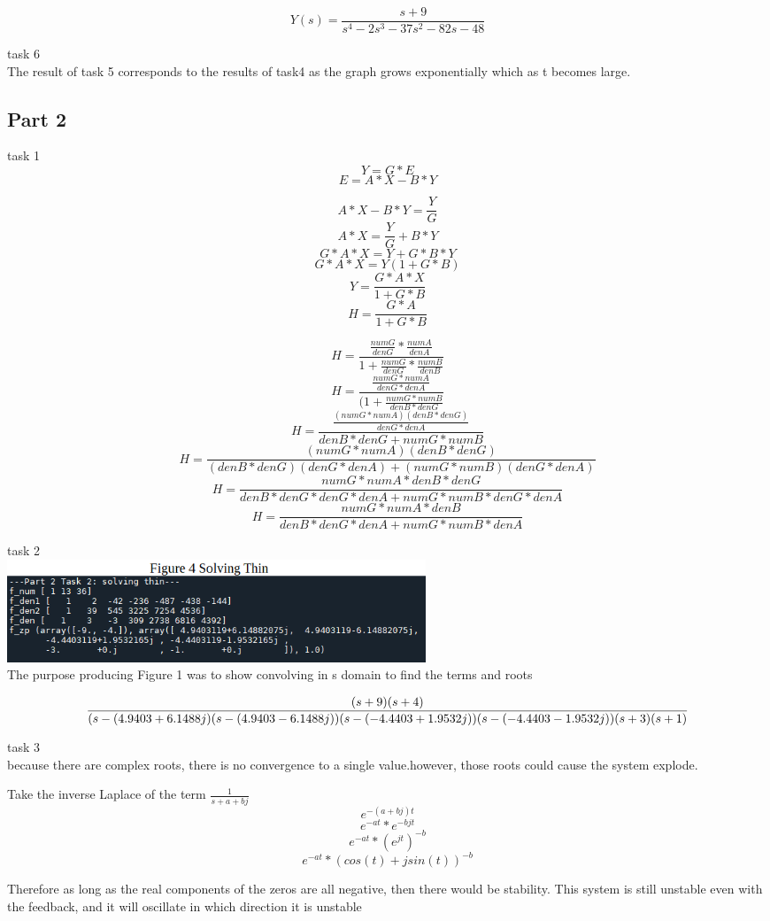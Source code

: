 \documentclass[12pt,a4paper]{article}
\begin{document}
\[Y(s) = \frac {s+9} {s^4-2s^3-37s^2-82s-48}\]

task 6\\
The result of task 5 corresponds to the results of task4 as the graph grows exponentially which as t becomes large.



\subsection*{Part 2}
task 1\\
\[Y = G*E\]
\[E=A*X-B*Y\]

\[A*X-B*Y = \frac Y G\]
\[A*X = \frac Y G +B*Y\]
\[G*A*X = Y+G*B*Y\]
\[G*A*X = Y(1+G*B)\]
\[Y = \frac {G*A*X} {1+G*B }\]
\[H = \frac{G*A}{1+G*B}\]


\[H = \frac {\frac{numG}{denG}* \frac{numA}{denA}}{1+\frac {numG}{denG}*\frac{numB}{denB}}\]
\[H = \frac {\frac{numG*numA}{denG*denA}}{(1+\frac{numG*numB}{denB*denG}}\]
\[H = \frac {\frac{(numG*numA)(denB*denG)}{denG*denA}}{denB*denG+numG*numB}\]
\[H = \frac {(numG*numA)(denB*denG)}{(denB*denG)(denG*denA)+(numG*numB)(denG*denA)}\]
\[H = \frac {numG*numA*denB*denG}{denB*denG*denG*denA+numG*numB*denG*denA}\]
\[H = \frac {numG*numA*denB}{denB*denG*denA + numG*numB*denA}\]


task 2\\
\includegraphics[width=0.55\textwidth]{Figure4.png}\\
The purpose producing Figure 1 was to show convolving in s domain to find the terms and roots

\begin{equation}
\tiny
\frac{(s+9)(s+4)} {(s-(4.9403+6.1488j)(s-(4.9403-6.1488j))(s-(-4.4403+1.9532j))(s-(-4.4403-1.9532j))(s+3)(s+1) }
\end{equation}

task 3\\
because there are complex roots, there is no convergence to a single value.however, those roots could cause the system explode.

Take the inverse Laplace of the term $\frac 1 {s+a+bj}$
\[e^{-(a+bj)t}\]
\[e^{-at}*e^{-bjt}\]
\[e^{-at}*(e^{jt})^{-b}\]
\[e^{-at}*(cos(t)+j sin(t))^{-b}\]

Therefore as long as the real components of the zeros are all negative, then  there would be stability. 
This system is still unstable even with the feedback, and it will oscillate in which direction it is unstable
\end{document}
